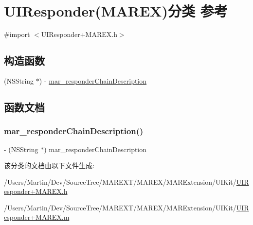 \hypertarget{category_u_i_responder_07_m_a_r_e_x_08}{}\section{U\+I\+Responder(M\+A\+R\+EX)分类 参考}
\label{category_u_i_responder_07_m_a_r_e_x_08}


{\ttfamily \#import $<$U\+I\+Responder+\+M\+A\+R\+E\+X.\+h$>$}

\subsection*{构造函数}
\begin{DoxyCompactItemize}
\item 
(N\+S\+String $\ast$) -\/ \hyperlink{category_u_i_responder_07_m_a_r_e_x_08_adabbff82e7f78fd93186064436c6eef2}{mar\+\_\+responder\+Chain\+Description}
\end{DoxyCompactItemize}


\subsection{函数文档}
\mbox{\label{category_u_i_responder_07_m_a_r_e_x_08_adabbff82e7f78fd93186064436c6eef2}} 
\subsubsection{\texorpdfstring{mar\+\_\+responder\+Chain\+Description()}{mar\_responderChainDescription()}}
{\footnotesize\ttfamily -\/ (N\+S\+String $\ast$) mar\+\_\+responder\+Chain\+Description \begin{DoxyParamCaption}{ }\end{DoxyParamCaption}}



该分类的文档由以下文件生成\+:\begin{DoxyCompactItemize}
\item 
/\+Users/\+Martin/\+Dev/\+Source\+Tree/\+M\+A\+R\+E\+X\+T/\+M\+A\+R\+E\+X/\+M\+A\+R\+Extension/\+U\+I\+Kit/\hyperlink{_u_i_responder_09_m_a_r_e_x_8h}{U\+I\+Responder+\+M\+A\+R\+E\+X.\+h}\item 
/\+Users/\+Martin/\+Dev/\+Source\+Tree/\+M\+A\+R\+E\+X\+T/\+M\+A\+R\+E\+X/\+M\+A\+R\+Extension/\+U\+I\+Kit/\hyperlink{_u_i_responder_09_m_a_r_e_x_8m}{U\+I\+Responder+\+M\+A\+R\+E\+X.\+m}\end{DoxyCompactItemize}
